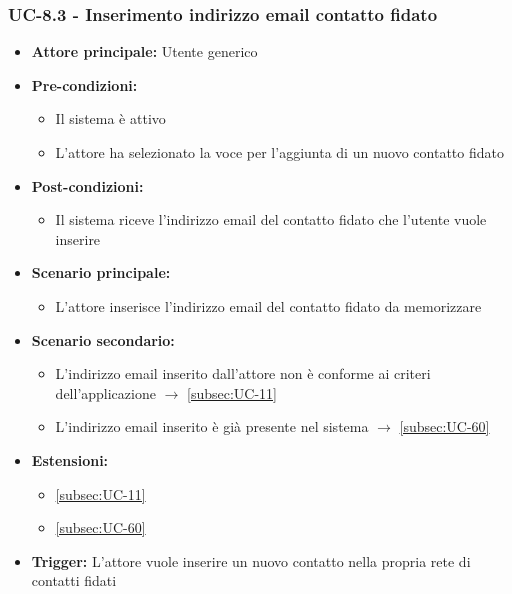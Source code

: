 \documentclass[a4paper,12pt]{article}
\begin{document}
\subsubsection{UC-8.3 - Inserimento indirizzo email contatto fidato} \label{subsec:UC-8.3}
\begin{itemize}
    \item \textbf{Attore principale:} Utente generico
    \item \textbf{Pre-condizioni:}
    \begin{itemize}
        \item Il sistema è attivo
        \item L'attore ha selezionato la voce per l'aggiunta di un nuovo contatto fidato
    \end{itemize}
    \item \textbf{Post-condizioni:} 
    \begin{itemize}
        \item Il sistema riceve l'indirizzo email del contatto fidato che l'utente vuole inserire
    \end{itemize}
    \item \textbf{Scenario principale:} 
    \begin{itemize}
        \item L'attore inserisce l'indirizzo email del contatto fidato da memorizzare
    \end{itemize}
    \item \textbf{Scenario secondario:}
    \begin{itemize}
        \item L'indirizzo email inserito dall'attore non è conforme ai criteri dell'applicazione $\rightarrow$ \ref{subsec:UC-11}
        \item L'indirizzo email inserito è già presente nel sistema $\rightarrow$ \ref{subsec:UC-60}
    \end{itemize}
    \item \textbf{Estensioni:} 
    \begin{itemize}
        \item \ref{subsec:UC-11}
        \item \ref{subsec:UC-60}
    \end{itemize}
    \item \textbf{Trigger:} L'attore vuole inserire un nuovo contatto nella propria rete di contatti fidati
\end{itemize}
\end{document}
